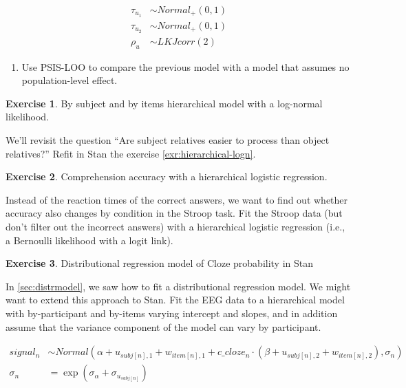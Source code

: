 \documentclass[12pt,]{krantz}
\providecommand{\tightlist}{%
  \setlength{\itemsep}{0pt}\setlength{\parskip}{0pt}}
\theoremstyle{definition}
\theoremstyle{definition}
\theoremstyle{definition}
\newtheorem{exercise}{Exercise}[chapter]
\theoremstyle{remark}
\begin{document}
\begin{equation}
\begin{aligned}
\tau_{u_1} &\sim Normal_+(0,1)\\
\tau_{u_2} &\sim Normal_+(0,1)\\
\rho_u &\sim LKJcorr(2) 
\end{aligned}
\end{equation}

\begin{enumerate}
\def\labelenumi{\alph{enumi}.}
\setcounter{enumi}{1}
\tightlist
\item
  Use PSIS-LOO to compare the previous model with a model that assumes
  no population-level effect.
\end{enumerate}

\begin{exercise}
\protect\hypertarget{exr:hierarchical-logn-stan}{}{\label{exr:hierarchical-logn-stan}
}By subject and by items hierarchical model with a log-normal
likelihood. \end{exercise}

We'll revisit the question ``Are subject relatives easier to process
than object relatives?'' Refit in Stan the exercise
\ref{exr:hierarchical-logn}.

\begin{exercise}
\protect\hypertarget{exr:strooplogis}{}{\label{exr:strooplogis}
}Comprehension accuracy with a hierarchical logistic regression.
\end{exercise}

Instead of the reaction times of the correct answers, we want to find
out whether accuracy also changes by condition in the Stroop task. Fit
the Stroop data (but don't filter out the incorrect answers) with a
hierarchical logistic regression (i.e., a Bernoulli likelihood with a
logit link).

\begin{exercise}
\protect\hypertarget{exr:distr-stan}{}{\label{exr:distr-stan}
}Distributional regression model of Cloze probability in Stan
\end{exercise}

In \ref{sec:distrmodel}, we saw how to fit a distributional regression
model. We might want to extend this approach to Stan. Fit the EEG data
to a hierarchical model with by-participant and by-items varying
intercept and slopes, and in addition assume that the variance component
of the model can vary by participant.

\begin{equation}
\begin{aligned}
  signal_n &\sim Normal(\alpha + u_{subj[n],1} + w_{item[n],1} + c\_cloze_n \cdot  (\beta + u_{subj[n],2}+ w_{item[n],2}), \sigma_n)\\
  \sigma_n &= \exp(\sigma_\alpha + \sigma_{u_{subj[n]}})
\end{aligned}
\end{equation}
\end{document}
